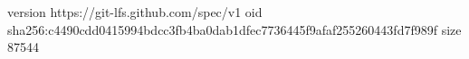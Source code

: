 version https://git-lfs.github.com/spec/v1
oid sha256:c4490cdd0415994bdcc3fb4ba0dab1dfec7736445f9afaf255260443fd7f989f
size 87544
